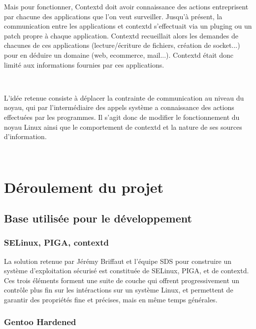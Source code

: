\documentclass[pdftex,a4paper,titlepage,11pt]{article}
\begin{document}
Mais pour fonctionner, Contextd doit avoir connaissance des actions entreprisent par chacune des applications que l'on veut surveiller. Jusqu'à présent, la communication entre les applications et contextd s'effectuait via un pluging ou un patch propre à chaque application. Contextd recueillait alors les demandes de chacunes de ces applications (lecture/écriture de fichiers, création de socket...) pour en déduire un domaine (web, ecommerce, mail...). Contextd était donc limité aux informations fournies par ces applications.

~

L'idée retenue consiste à déplacer la contrainte de communication au niveau du noyau, qui par l'intermédiaire des appels système a connaissance des actions effectuées par les programmes. Il s'agit donc de modifier le fonctionnement du noyau Linux ainsi que le comportement de contextd et la nature de ses sources d'information.

~

\newpage



\newpage

\section{Déroulement du projet}

\subsection{Base utilisée pour le développement}


\subsubsection{SELinux, PIGA, contextd}

La solution retenue par Jérémy Briffaut et l'équipe SDS pour construire un système d'exploitation sécurisé est constituée de SELinux, PIGA, et de contextd. Ces trois éléments forment une suite de couche qui offrent progressivement un contrôle plus fin sur les intéractions sur un système Linux, et permettent de garantir des propriétés fine et précises, mais en même temps générales.

\subsubsection{Gentoo Hardened}
\end{document}
